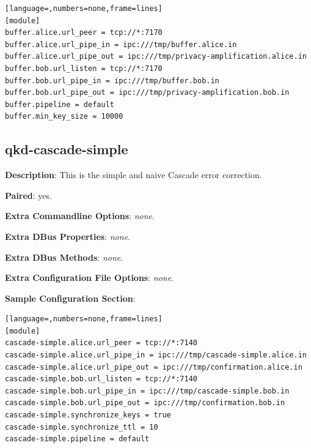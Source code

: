 \begin{lstlisting}[language=,numbers=none,frame=lines]
[module]
buffer.alice.url_peer = tcp://*:7170
buffer.alice.url_pipe_in = ipc:///tmp/buffer.alice.in
buffer.alice.url_pipe_out = ipc:///tmp/privacy-amplification.alice.in
buffer.bob.url_listen = tcp://*:7170
buffer.bob.url_pipe_in = ipc:///tmp/buffer.bob.in
buffer.bob.url_pipe_out = ipc:///tmp/privacy-amplification.bob.in
buffer.pipeline = default
buffer.min_key_size = 10000
\end{lstlisting}

\clearpage


\subsection{qkd-cascade-simple}
\label{subsec:qkd-cascade-simple}

\textbf{Description}: This is the simple and naive Cascade error correction.

\bigskip

\noindent \textbf{Paired}: yes.

\bigskip

\noindent \textbf{Extra Commandline Options}: \emph{none}.

\bigskip

\noindent \textbf{Extra DBus Properties}: \emph{none}.

\bigskip

\noindent \textbf{Extra DBus Methods}: \emph{none}.

\bigskip

\noindent \textbf{Extra Configuration File Options}: \emph{none}.

\bigskip

\noindent \textbf{Sample Configuration Section}: 

\medskip

\begin{lstlisting}[language=,numbers=none,frame=lines]
[module]
cascade-simple.alice.url_peer = tcp://*:7140
cascade-simple.alice.url_pipe_in = ipc:///tmp/cascade-simple.alice.in
cascade-simple.alice.url_pipe_out = ipc:///tmp/confirmation.alice.in
cascade-simple.bob.url_listen = tcp://*:7140
cascade-simple.bob.url_pipe_in = ipc:///tmp/cascade-simple.bob.in
cascade-simple.bob.url_pipe_out = ipc:///tmp/confirmation.bob.in
cascade-simple.synchronize_keys = true
cascade-simple.synchronize_ttl = 10
cascade-simple.pipeline = default
\end{lstlisting}

\clearpage


